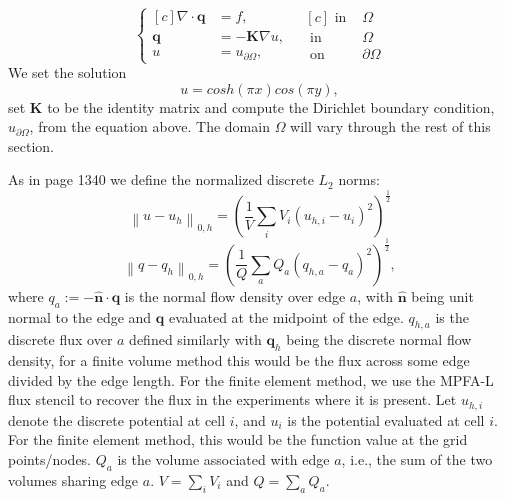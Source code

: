 \documentclass[../Main/main.tex]{subfiles}
\begin{document}
		\begin{equation}\label{eq:model}
			\left \{
		\begin{aligned}[c]
			\nabla \cdot \bm{q} &= f, \\
			\bm{q} &= -\bm{K}\nabla u, \\
			u &= u_{\partial \Omega},
		\end{aligned}
		\ \ \
		\begin{aligned}[c]
			\text{ in }& \Omega \\
			\text{ in }& \Omega \\
			\text{ on }& \partial \Omega
		\end{aligned}
		\right.
		\end{equation}
		We set the solution
		\begin{equation}\label{eq:pressure_solution_model}
			u = cosh(\pi x)cos(\pi y),
		\end{equation} 
		set $\bm{K}$ to be the identity matrix and compute the Dirichlet boundary condition, $u_{\partial \Omega}$, from the equation above. The domain $\Omega$ will vary through the rest of this section.\par
		As in \cite{https://doi.org/10.1002/num.20320} page 1340 we define the normalized discrete $L_2$ norms:
		\begin{equation}
			\left \| u - u_h \right \|_{0,h} =  \left (  \frac{1}{V}\sum_i V_i(u_{h,i}-u_i)^2\right )^{\frac{1}{2}}
		\end{equation}
		\begin{equation}\label{eq:normal_flow_density}
			\left \| q - q_h \right \|_{0,h} =  \left (  \frac{1}{Q}\sum_a Q_a(q_{h,a}-q_a)^2\right )^{\frac{1}{2}},
		\end{equation}
		where $q_a := -\bm{\hat{n}} \cdot \bm{q}$ is the normal flow density over edge $a$, with $\bm{\hat{n}}$ being unit normal to the edge and $\bm q$ evaluated at the midpoint of the edge. $q_{h,a}$ is the discrete flux over $a$ defined similarly with $\bm{q}_h$ being the discrete normal flow density, for a finite volume method this would be the flux across some edge divided by the edge length. 
		For the finite element method, we use the MPFA-L flux stencil to recover the flux in the experiments where it is present.
		 Let $u_{h,i}$ denote the discrete potential at cell $i$, and $u_i$ is the potential evaluated at cell $i$. For the finite element method, this would be the function value at the grid points/nodes. $Q_a$ is the volume associated with edge $a$, i.e., the sum of the two volumes sharing edge $a$. $V = \sum_{i} V_i$ and $Q = \sum_{a} Q_a$.
\end{document}
